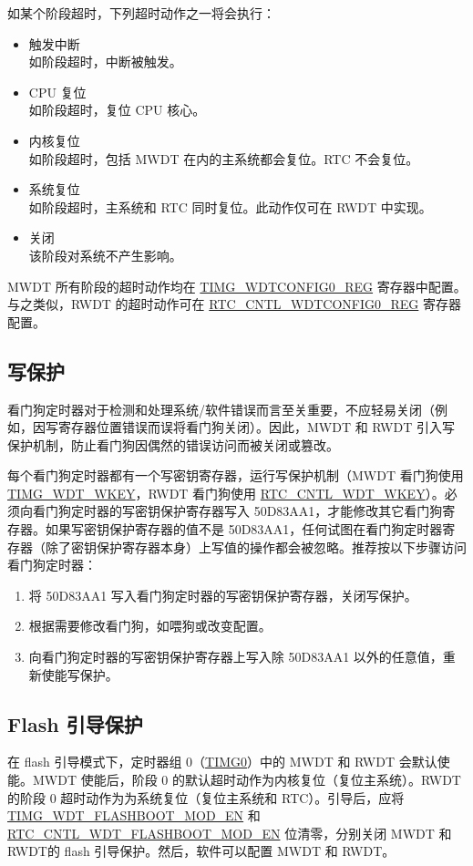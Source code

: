 \documentclass[main\_\_CN.tex]{subfiles}
\begin{document}
如某个阶段超时，下列超时动作之一将会执行：
\begin{itemize}
    \item 触发中断\\
    如阶段超时，中断被触发。
    \item CPU 复位\\
    如阶段超时，复位 CPU 核心。
    \item 内核复位\\
    如阶段超时，包括 MWDT 在内的主系统都会复位。RTC 不会复位。
    \item 系统复位\\
    如阶段超时，主系统和 RTC 同时复位。此动作仅可在 RWDT 中实现。
    \item 关闭\\
    该阶段对系统不产生影响。
\end{itemize}

MWDT 所有阶段的超时动作均在 \hyperref[regdesc:TIMGWDTCONFIG0REG]{TIMG\_WDTCONFIG0\_REG} 寄存器中配置。与之类似，RWDT 的超时动作可在 \hyperref[regdesc:RTCCNTLWDTCONFIG0REG]{RTC\_CNTL\_WDTCONFIG0\_REG} 寄存器配置。

\subsection{写保护}
看门狗定时器对于检测和处理系统/软件错误而言至关重要，不应轻易关闭（例如，因写寄存器位置错误而误将看门狗关闭）。因此，MWDT 和 RWDT 引入写保护机制，防止看门狗因偶然的错误访问而被关闭或篡改。

每个看门狗定时器都有一个写密钥寄存器，运行写保护机制（MWDT 看门狗使用 \hyperref[fielddesc:TIMGWDTWKEY]{TIMG\_WDT\_WKEY}，RWDT 看门狗使用 \hyperref[fielddesc:RTCCNTLWDTWKEY]{RTC\_CNTL\_WDT\_WKEY}）。必须向看门狗定时器的写密钥保护寄存器写入 \hexprefix{}50D83AA1，才能修改其它看门狗寄存器。如果写密钥保护寄存器的值不是 \hexprefix{}50D83AA1，任何试图在看门狗定时器寄存器（除了密钥保护寄存器本身）上写值的操作都会被忽略。推荐按以下步骤访问看门狗定时器：
\begin{enumerate}
\item 将 \hexprefix{}50D83AA1 写入看门狗定时器的写密钥保护寄存器，关闭写保护。
\item 根据需要修改看门狗，如喂狗或改变配置。
\item 向看门狗定时器的写密钥保护寄存器上写入除 \hexprefix{}50D83AA1 以外的任意值，重新使能写保护。
\end{enumerate}

\subsection{Flash 引导保护}
在 flash 引导模式下，定时器组 0（\hyperref[TIMG0]{TIMG0}）中的 MWDT 和 RWDT 会默认使能。MWDT 使能后，阶段 0 的默认超时动作为内核复位（复位主系统）。RWDT 的阶段 0 超时动作为为系统复位（复位主系统和 RTC）。引导后，应将 \hyperref[fielddesc:TIMGWDTFLASHBOOTMODEN]{TIMG\_WDT\_FLASHBOOT\_MOD\_EN} 和 \hyperref[fielddesc:RTCCNTLWDTFLASHBOOTMODEN]{RTC\_CNTL\_WDT\_FLASHBOOT\_MOD\_EN} 位清零，分别关闭 MWDT 和 RWDT的 flash 引导保护。然后，软件可以配置 MWDT 和 RWDT。
\end{document}

